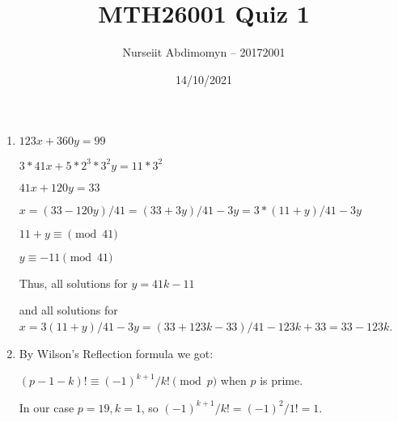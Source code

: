 \documentclass[12pt]{article}
\title{MTH26001 Quiz 1}
\author{Nurseiit Abdimomyn -- 20172001}
\date{14/10/2021}
\begin{document}
\maketitle

\begin{enumerate}
  \item
  $123x + 360y = 99$

  $3 * 41x + 5 * 2^3 * 3^2y = 11 * 3^2$
  
  $41x + 120y = 33$
  
  $x = (33 - 120y) / 41 = (33 + 3y) / 41 - 3y = 3 * (11 + y) / 41 - 3y$
  
  $11 + y \equiv \pmod{41}$

  $y \equiv -11 \pmod {41}$

  Thus, all solutions for  $y = 41k - 11$

  and all solutions for $x = 3(11 + y)/41 - 3y = (33 + 123k - 33) / 41 - 123k + 33 = 33 - 123k$.

  \item
  By Wilson's Reflection formula we got:

  $(p - 1 - k)! \equiv (-1)^{k + 1} / k! \pmod p$ when $p$ is prime.

  In our case $p = 19, k = 1$, so $(-1)^{k + 1} / k! = (-1)^2 / 1! = 1$.



  

\end{enumerate}
\end{document}

